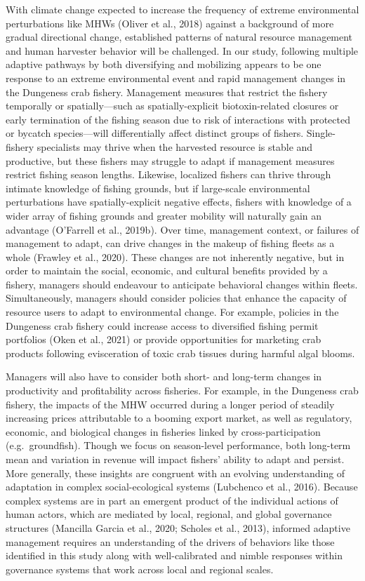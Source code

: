 \documentclass[]{elsarticle} %
\begin{document}
With climate change expected to increase the frequency of extreme
environmental perturbations like MHWs (Oliver et al., 2018) against a
background of more gradual directional change, established patterns of
natural resource management and human harvester behavior will be
challenged. In our study, following multiple adaptive pathways by both
diversifying and mobilizing appears to be one response to an extreme
environmental event and rapid management changes in the Dungeness crab
fishery. Management measures that restrict the fishery temporally or
spatially---such as spatially-explicit biotoxin-related closures or
early termination of the fishing season due to risk of interactions with
protected or bycatch species---will differentially affect distinct
groups of fishers. Single-fishery specialists may thrive when the
harvested resource is stable and productive, but these fishers may
struggle to adapt if management measures restrict fishing season
lengths. Likewise, localized fishers can thrive through intimate
knowledge of fishing grounds, but if large-scale environmental
perturbations have spatially-explicit negative effects, fishers with
knowledge of a wider array of fishing grounds and greater mobility will
naturally gain an advantage (O'Farrell et al., 2019b). Over time,
management context, or failures of management to adapt, can drive
changes in the makeup of fishing fleets as a whole (Frawley et al.,
2020). These changes are not inherently negative, but in order to
maintain the social, economic, and cultural benefits provided by a
fishery, managers should endeavour to anticipate behavioral changes
within fleets. Simultaneously, managers should consider policies that
enhance the capacity of resource users to adapt to environmental change.
For example, policies in the Dungeness crab fishery could increase
access to diversified fishing permit portfolios (Oken et al., 2021) or
provide opportunities for marketing crab products following evisceration
of toxic crab tissues during harmful algal blooms.

Managers will also have to consider both short- and long-term changes in
productivity and profitability across fisheries. For example, in the
Dungeness crab fishery, the impacts of the MHW occurred during a longer
period of steadily increasing prices attributable to a booming export
market, as well as regulatory, economic, and biological changes in
fisheries linked by cross-participation (e.g.~groundfish). Though we
focus on season-level performance, both long-term mean and variation in
revenue will impact fishers' ability to adapt and persist. More
generally, these insights are congruent with an evolving understanding
of adaptation in complex social-ecological systems (Lubchenco et al.,
2016). Because complex systems are in part an emergent product of the
individual actions of human actors, which are mediated by local,
regional, and global governance structures (Mancilla Garcia et al.,
2020; Scholes et al., 2013), informed adaptive management requires an
understanding of the drivers of behaviors like those identified in this
study along with well-calibrated and nimble responses within governance
systems that work across local and regional scales.
\end{document}
